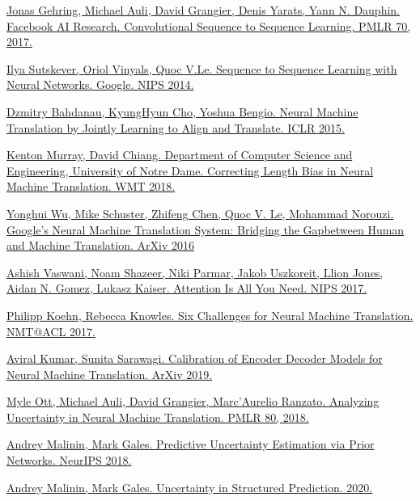 \documentclass[a4paper,14pt]{extarticle}
\begin{document}
	
	\begin{thebibliography}{0}		
		\hypertarget{fconv}{}
		\href{https://arxiv.org/pdf/1705.03122.pdf}
		{Jonas Gehring, Michael Auli, David Grangier, Denis Yarats, Yann N. Dauphin. Facebook AI Research. Convolutional Sequence to Sequence Learning. PMLR 70, 2017.}
		
		\hypertarget{seq2seq}{}
		\href{https://papers.nips.cc/paper/5346-sequence-to-sequence-learning-with-neural-networks.pdf}
		{Ilya Sutskever, Oriol Vinyals, Quoc V.Le. Sequence to Sequence Learning with Neural Networks. Google. NIPS 2014.}
		
		\hypertarget{encdec_att}{}
		\href{https://arxiv.org/pdf/1409.0473.pdf}
		{Dzmitry Bahdanau, KyungHyun Cho, Yoshua Bengio. Neural Machine Translation by Jointly Learning to Align and Translate. ICLR 2015.}
		
		\hypertarget{corr_len_bias}{}
		\href{https://arxiv.org/pdf/1808.10006.pdf}
		{Kenton Murray, David Chiang. Department of Computer Science and Engineering, University of Notre Dame. Correcting Length Bias in Neural Machine Translation. WMT 2018.}
		
		\hypertarget{gnmt}{}
		\href{https://arxiv.org/pdf/1609.08144.pdf}
		{Yonghui Wu, Mike Schuster, Zhifeng Chen, Quoc V. Le, Mohammad Norouzi. Google’s Neural Machine Translation System: Bridging the Gapbetween Human and Machine Translation. ArXiv 2016}
		
		\hypertarget{transformer}{}
		\href{https://arxiv.org/pdf/1706.03762.pdf}
		{Ashish Vaswani, Noam Shazeer, Niki Parmar, Jakob Uszkoreit, Llion Jones, Aidan N. Gomez, Lukasz Kaiser. Attention Is All You Need. NIPS 2017.}
		
		\hypertarget{six_chall}{}
		\href{https://arxiv.org/pdf/1706.03872.pdf}
		{Philipp Koehn, Rebecca Knowles. Six Challenges for Neural Machine Translation. NMT@ACL 2017.}
		
		\hypertarget{calibration}{}
		\href{https://arxiv.org/pdf/1903.00802v1.pdf}
		{Aviral Kumar, Sunita Sarawagi. Calibration of Encoder Decoder Models for Neural Machine Translation. ArXiv 2019.}
		
		\hypertarget{anal_uncertainty}{}
		\href{https://arxiv.org/pdf/1803.00047.pdf}
		{Myle Ott, Michael Auli, David Grangier, Marc'Aurelio Ranzato. Analyzing Uncertainty in Neural Machine Translation. PMLR 80, 2018.}
		
		\hypertarget{prior}{}
		\href{https://papers.nips.cc/paper/7936-predictive-uncertainty-estimation-via-prior-networks.pdf}
		{Andrey Malinin, Mark Gales. Predictive Uncertainty Estimation via Prior Networks. NeurIPS 2018.}
		
		\hypertarget{uncertainty}{}
		\href{https://arxiv.org/pdf/2002.07650.pdf}
		{Andrey Malinin, Mark Gales. Uncertainty in Structured Prediction. 2020.}
	\end{thebibliography}
\end{document}
